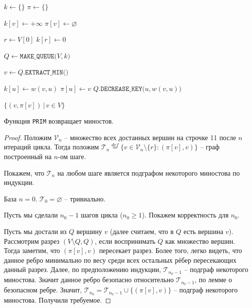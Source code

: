 \begin{algorithm}[H]
\caption{Алгоритм Прима}
\begin{algorithmic}[1]

    \State $k \gets \{\}$
    \State $\pi \gets \{\}$

        \State $k[v] \gets +\infty$
        \State $\pi[v] \gets \varnothing$
    \EndFor

    \State $r \gets V[0]$
    \State $k[r] \gets 0$ 

    \State $Q \gets \texttt{MAKE\_QUEUE(}V, k\texttt{)}$ 

        \State $v \gets Q\texttt{.EXTRACT\_MIN()}$

                \State $k[u] \gets w(v, u)$
                \State $\pi[u] \gets v$ 
                \State $Q\texttt{.DECREASE\_KEY(}u, w(v, u)\texttt{)}$
            \EndIf
        \EndFor
    \EndWhile

    \State \Return $\{ (v, \pi[v]) \, | \, v \in V \}$
\EndFunction
\end{algorithmic}
\end{algorithm}

\St Функция \texttt{PRIM} возвращает миностов.
\begin{proof}

    Положим $\mathcal{V}_n$ -- множество всех достанных вершин на строчке 11 после $n$ итераций цикла. 
    Тогда положим $\mathcal{T}_n \overset{def}{=} \{ v \in \mathcal{V}_n \setminus \{ r \}:  (\pi[v], v) \}$ -- граф построенный на $n$-ом шаге.

    Покажем, что $\mathcal{T}_n$ на любом шаге является подграфом некоторого миностова по индукции.

    База $n = 0$. $\mathcal{T}_0 = \varnothing$ -- тривиально.
    
    Пусть мы сделали $n_0 - 1$ шагов цикла ($n_0 \geq 1$). Покажем корректность для $n_0$.

    Пусть мы достали из $Q$ вершину $v$ (далее считаем, что в $Q$ есть вершина $v$). 
    Рассмотрим разрез $(V \setminus Q, Q)$, если воспринимать $Q$ как множество вершин.
    Тогда заметим, что $(\pi[v], v)$ пересекает разрез.
    Более того, легко видеть, что данное ребро минимально по весу среди всех остальных рёбер пересекающих данный разрез.
    Далее, по предположению индукции, $\mathcal{T}_{n_0 - 1}$ -- подграф некоторого миностова.
    Значит данное ребро безопасно относительно $\mathcal{T}_{n_0 - 1}$, по лемме о безопасном ребре. 
    Значит, $\mathcal{T}_{n_0} = \mathcal{T}_{n_0 - 1} \cup \{(\pi[v], v)\}$ -- подграф некоторого миностова. Получили требуемое.

\end{proof}

